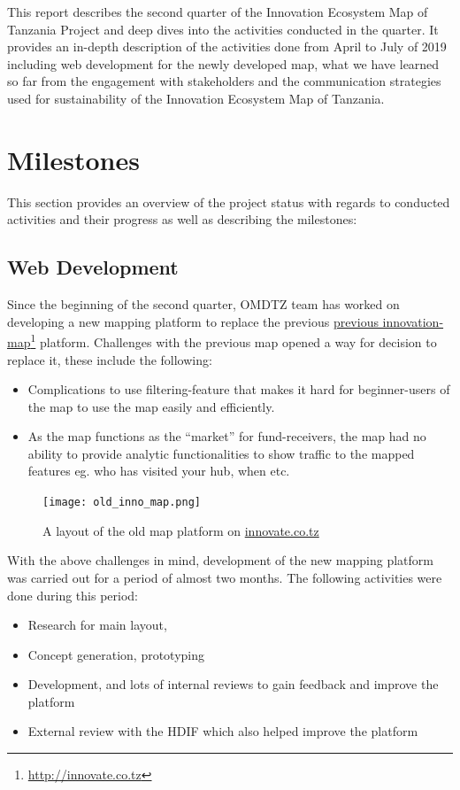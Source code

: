\documentclass[a4paper,12pt,twoside]{article}
\begin{document}
This report describes the second quarter of the Innovation Ecosystem Map of Tanzania Project and deep dives into the activities conducted in the quarter. It provides an in-depth description of the activities done from April to July of 2019 including web development for the newly developed map, what we have learned so far from the engagement with stakeholders and the communication strategies used for sustainability of the Innovation Ecosystem Map of Tanzania.



\section{Milestones}
This section provides an overview of the project status with regards to conducted activities and their progress as well as describing the milestones:

\subsection{Web Development}
Since the beginning of the second quarter, OMDTZ team has worked on developing a new mapping platform to replace the previous \href{http://innovate.co.tz}{previous innovation-map}\footnote{\url{http://innovate.co.tz}} platform. Challenges with the previous map opened a way for decision to replace it, these include the following:

\begin{itemize}
    \item Complications to use filtering-feature that makes it hard for beginner-users of the map to use the map easily and efficiently.
    \item As the map functions as the “market” for fund-receivers, the map had no ability to provide analytic functionalities to show traffic to the mapped features eg. who has visited your hub, when etc.
\end{itemize}

\begin{figure}[h]
    \centering
    \texttt{[image: old\_inno\_map.png]}
    \caption{A layout of the old map platform on \href{innovate.co.tz}{innovate.co.tz}}
\end{figure}

With the above challenges in mind, development of the new mapping platform was carried out for a period of almost two months. The following activities were done during this period:


\begin{itemize}
	\item Research for main layout,
	\item Concept generation, prototyping
	\item Development, and lots of internal reviews to gain feedback and improve the platform
	\item External review with the HDIF which also helped improve the platform
\end{itemize}
\end{document}
